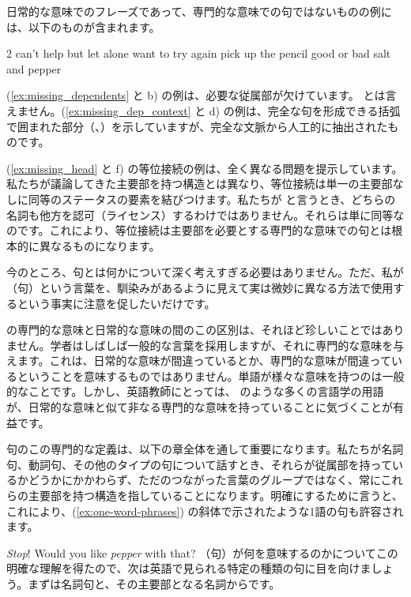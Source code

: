 日常的な意味でのフレーズであって、専門的な意味での句ではないものの例には、以下のものが含まれます。

\setlength{\columnsep}{0pt}
\begin{multicols}{2}
\ea
    \ea \label{ex:missing_dependents} can't help but
    \ex let alone
    \ex \label{ex:missing_dep_context} {\ob}want to{\cb} try again
    \ex {\ob}pick up{\cb} the pencil
    \ex good or bad\label{ex:missing_head}
    \ex  salt and pepper
\z
\z
\end{multicols}
(\ref{ex:missing_dependents} と b) の例は、必要な従属部が欠けています。 とは言えません。(\ref{ex:missing_dep_context} と d) の例は、完全な句を形成できる括弧で囲まれた部分（、）を示していますが、完全な文脈から人工的に抽出されたものです。

(\ref{ex:missing_head} と f) の等位接続の例は、全く異なる問題を提示しています。私たちが議論してきた主要部を持つ構造とは異なり、等位接続は単一の主要部なしに同等のステータスの要素を結びつけます。私たちが  と言うとき、どちらの名詞も他方を認可（ライセンス）するわけではありません。それらは単に同等なのです。これにより、等位接続は主要部を必要とする専門的な意味での句とは根本的に異なるものになります。

今のところ、句とは何かについて深く考えすぎる必要はありません。ただ、私が （句）という言葉を、馴染みがあるように見えて実は微妙に異なる方法で使用するという事実に注意を促したいだけです。

 の専門的な意味と日常的な意味の間のこの区別は、それほど珍しいことではありません。学者はしばしば一般的な言葉を採用しますが、それに専門的な意味を与えます。これは、日常的な意味が間違っているとか、専門的な意味が間違っているということを意味するものではありません。単語が様々な意味を持つのは一般的なことです。しかし、英語教師にとっては、 のような多くの言語学の用語が、日常的な意味と似て非なる専門的な意味を持っていることに気づくことが有益です。

句のこの専門的な定義は、以下の章全体を通して重要になります。私たちが名詞句、動詞句、その他のタイプの句について話すとき、それらが従属部を持っているかどうかにかかわらず、ただのつながった言葉のグループではなく、常にこれらの主要部を持つ構造を指していることになります。明確にするために言うと、これにより、(\ref{ex:one-word-phrases}) の斜体で示されたような1語の句も許容されます。

\ea \label{ex:one-word-phrases}
    \ea \emph{Stop}!
    \ex Would you like \emph{pepper} with that?
\z\z
{}（句）が何を意味するのかについてこの明確な理解を得たので、次は英語で見られる特定の種類の句に目を向けましょう。まずは名詞句と、その主要部となる名詞からです。

